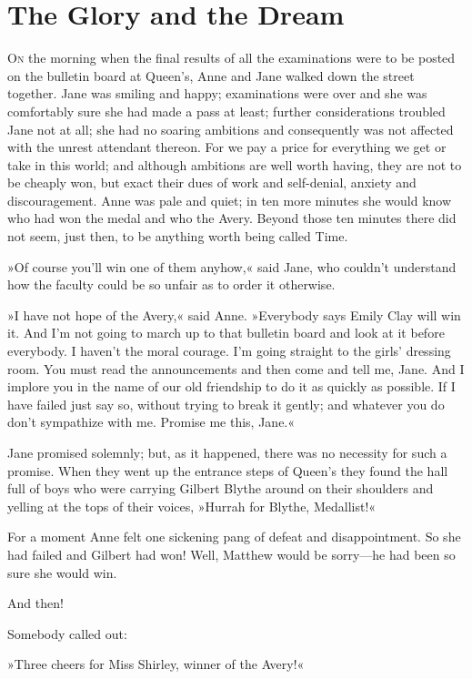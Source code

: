 \chapter{The Glory and the Dream}

\lettrine[lines=4]{O}{n} the morning when the final results of all the examinations were to be posted on the bulletin board at Queen's, Anne and Jane walked down the street together. Jane was smiling and happy; examinations were over and she was comfortably sure she had made a pass at least; further considerations troubled Jane not at all; she had no soaring ambitions and consequently was not affected with the unrest attendant thereon. For we pay a price for everything we get or take in this world; and although ambitions are well worth having, they are not to be cheaply won, but exact their dues of work and self-denial, anxiety and discouragement. Anne was pale and quiet; in ten more minutes she would know who had won the medal and who the Avery. Beyond those ten minutes there did not seem, just then, to be anything worth being called Time.

»Of course you'll win one of them anyhow,« said Jane, who couldn't understand how the faculty could be so unfair as to order it otherwise.

»I have not hope of the Avery,« said Anne. »Everybody says Emily Clay will win it. And I'm not going to march up to that bulletin board and look at it before everybody. I haven't the moral courage. I'm going straight to the girls' dressing room. You must read the announcements and then come and tell me, Jane. And I implore you in the name of our old friendship to do it as quickly as possible. If I have failed just say so, without trying to break it gently; and whatever you do don't sympathize with me. Promise me this, Jane.«

Jane promised solemnly; but, as it happened, there was no necessity for such a promise. When they went up the entrance steps of Queen's they found the hall full of boys who were carrying Gilbert Blythe around on their shoulders and yelling at the tops of their voices, »Hurrah for Blythe, Medallist!«

For a moment Anne felt one sickening pang of defeat and disappointment. So she had failed and Gilbert had won! Well, Matthew would be sorry—he had been so sure she would win.

And then!

Somebody called out:

»Three cheers for Miss Shirley, winner of the Avery!«

